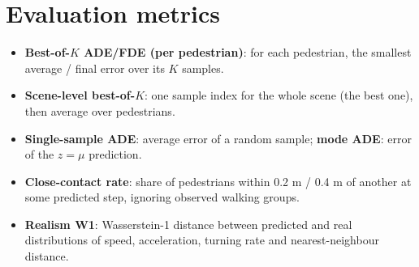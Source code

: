 \documentclass[10pt]{article}
\begin{document}
\section{Evaluation metrics}
\begin{itemize}
\item \textbf{Best-of-$K$ ADE/FDE (per pedestrian)}: for each pedestrian, the smallest average / final error over its $K$ samples.
\item \textbf{Scene-level best-of-$K$}: one sample index for the whole scene (the best one), then average over pedestrians.
\item \textbf{Single-sample ADE}: average error of a random sample; \textbf{mode ADE}: error of the $z=\mu$ prediction.
\item \textbf{Close-contact rate}: share of pedestrians within 0.2 m / 0.4 m of another at some predicted step, ignoring observed walking groups.
\item \textbf{Realism W1}: Wasserstein-1 distance between predicted and real distributions of speed, acceleration, turning rate and nearest-neighbour distance.
\end{itemize}
\end{document}

